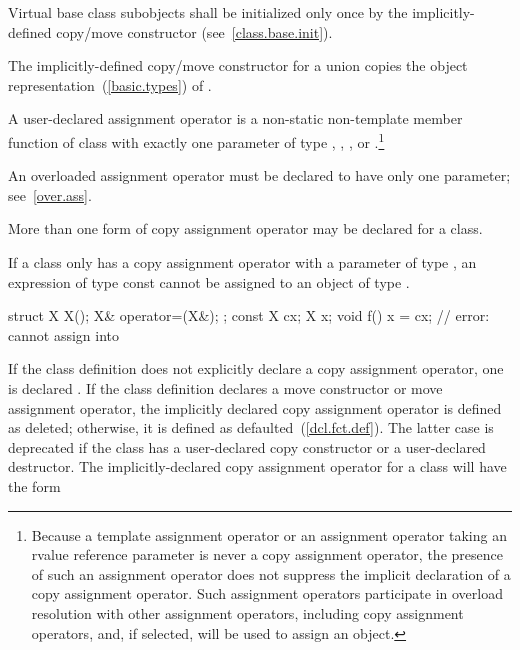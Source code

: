 %
Virtual base class subobjects shall be initialized only once by
the implicitly-defined copy/move constructor (see~\ref{class.base.init}).

\pnum
The implicitly-defined copy/move constructor for a union
 copies the object representation~(\ref{basic.types}) of .%
%

\pnum
{}%
%
A user-declared  assignment operator  is a
non-static non-template member function of class  with exactly one
parameter of type , ,  ,
  or  
.\footnote{Because a template assignment operator or an assignment
operator taking an rvalue reference parameter is never a copy assignment
operator, the presence of such an assignment operator does not suppress the
implicit declaration of a copy assignment operator. Such assignment operators
participate in overload resolution with other assignment operators, including
copy assignment operators, and, if selected, will be used to assign an object.}
\begin{note}
An overloaded assignment operator must be declared to have only one parameter;
see~\ref{over.ass}.
\end{note}
\begin{note}
More than one form of copy assignment operator may be declared for a class.
\end{note}
\begin{note}
If a class
only has a copy assignment operator with a parameter of type
,
an expression of type const
cannot be assigned to an object of type
.
\begin{example}

\begin{codeblock}
struct X {
  X();
  X& operator=(X&);
};
const X cx;
X x;
void f() {
  x = cx;           // error:  cannot assign  into 
}
\end{codeblock}
\end{example}
\end{note}

\pnum
{}%
If the class definition does not explicitly declare a copy assignment operator,
one is declared . If the class definition declares a move
constructor or move assignment operator, the implicitly declared copy
assignment operator is defined as deleted; otherwise, it is defined as
defaulted~(\ref{dcl.fct.def}).
The latter case is deprecated if the class has a user-declared copy constructor
or a user-declared destructor.
The implicitly-declared copy assignment operator for a class
will have the form

